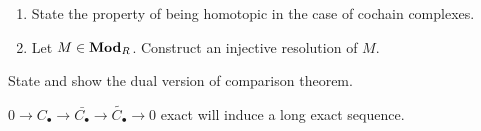 \begin{exercise} \mbox{}
  \begin{enumerate}[(1)]
    \item State the property of being homotopic in the case of cochain complexes.
    \item Let $M \in \mathbf{Mod}_R$. Construct an injective resolution of $M$.
  \end{enumerate}
\end{exercise}

\begin{exercise}
  State and show the dual version of comparison theorem.
\end{exercise}

\begin{exercise}
  $0 \to C_\bullet \to \bar{C_\bullet} \to \tilde{C_\bullet} \to 0$ exact
  will induce a long exact sequence.
\end{exercise}
